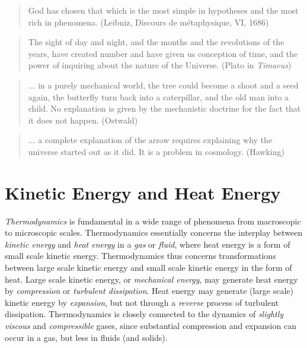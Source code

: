 \small

\begin{quote}
God has chosen that which is the most simple in 
hypotheses and the most rich in phenomena. (Leibniz, 
Discours de m\'etaphysique, VI, 1686)
\end{quote} 


\begin{quote}
The sight of day and night, and the months and the revolutions of the
years, have created number and have given us conception of time,
and the power of inquiring about the nature of the Universe. (Plato 
in \emph{Timaeus})
\end{quote}

\begin{quote}
... in a purely mechanical world, the tree could become a shoot 
and a seed again, the butterfly turn back into a caterpillar, and the
old man into a child. No explanation is given by the mechanistic doctrine
for the fact that it does not happen. (Ostwald)
\end{quote}

\begin{quote} ... a complete explanation of the arrow requires
explaining why the universe started out as it did. It is a problem
in cosmology. (Hawking)
\end{quote}
\normalsize

\section{Kinetic Energy and Heat Energy}

\emph{Thermodynamics} is fundamental in a wide range of phenomena from
macroscopic to microscopic scales. 
Thermodynamics essentially concerns the interplay between
\emph{kinetic energy} and  \emph{heat energy} in a \emph{gas} or \emph{fluid},
where heat energy is a form of small scale kinetic energy.
Thermodynamics thus concerns transformations between large scale
kinetic energy and small scale kinetic energy in the form of heat.
Large scale kinetic energy, or \emph{mechanical energy}, 
may generate heat energy by 
\emph{compression} or \emph{turbulent dissipation}. 
Heat energy may generate (large scale) kinetic energy by \emph{expansion}, but
not through a \emph{reverse} process of turbulent dissipation. 
Thermodynamics is closely connected to the dynamics of \emph{slightly viscous}
and \emph{compressible} gases, since substantial compression and 
expansion can occur in a gas, but less in fluids (and solids).

